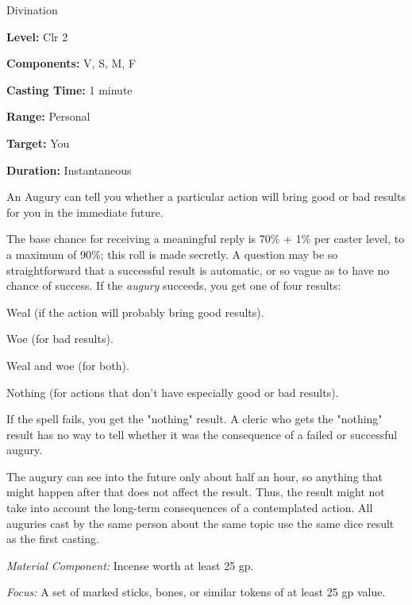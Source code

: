 
Divination

\textbf{Level:} Clr 2

\textbf{Components:} V, S, M, F

\textbf{Casting Time:} 1 minute

\textbf{Range:} Personal

\textbf{Target:} You

\textbf{Duration:} Instantaneous

An Augury can tell you whether a particular action will bring good or 
bad results for you in the immediate future.

The base chance for receiving a meaningful reply is 70\% + 1\% per caster level, 
to a maximum of 90\%; this roll is made secretly. A question may be so straightforward 
that a successful result is automatic, or so vague as to have no chance of success. 
If the \textit{augury} succeeds, you get one of four results:

\begin{itemize*}
\item Weal (if the action will probably bring good results).
\item Woe (for bad results).
\item Weal and woe (for both).
\item Nothing (for actions that don't have especially good or bad results).
\end{itemize*}

If the spell fails, you get the "nothing" result. A cleric who gets the "nothing" 
result has no way to tell whether it was the consequence of a failed or successful 
augury.

The augury can see into the future only about half an hour, so anything 
that might happen after that does not affect the result. Thus, the result might 
not take into account the long-term consequences of a contemplated action. All 
auguries cast by the same person about the same topic use the same dice 
result as the first casting.

\textit{Material Component:} Incense worth at least 25 gp.

\textit{Focus:} A set of marked sticks, bones, or similar tokens of at least 25 
gp value.

